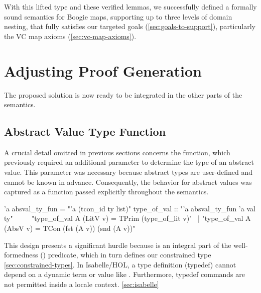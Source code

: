 With this lifted type and these verified lemmas, we successfully defined a formally sound semantics for Boogie maps, supporting up to three levels of domain nesting, that fully satisfies our targeted goals (\ref{sec:goals-to-support}), particularly the VC map axioms (\ref{sec:vc-map-axioms}).


\section{Adjusting Proof Generation}
\label{sec:proofgen-module}

The proposed solution is now ready to be integrated in the other parts of the semantics.

\subsection{Abstract Value Type Function}

A crucial detail omitted in previous sections concerns the  function, which previously required an additional parameter to determine the type of an abstract value.
This parameter was necessary because abstract types are user-defined and cannot be known in advance.
Consequently, the behavior for abstract values was captured as a function passed explicitly throughout the semantics.


\begin{isabellebody}\isanewline
{} 'a absval\_ty\_fun = "'a {\isasymRightarrow} (tcon\_id \isasymtimes ty list)"\isanewline
\isanewline
{} type\_of\_val :: "'a absval\_ty\_fun {\isasymRightarrow} 'a val {\isasymRightarrow} ty"\isanewline
\  \isanewline
\ \ \ "type\_of\_val A (LitV v) = TPrim (type\_of\_lit v)"\isanewline
\ | "type\_of\_val A (AbsV v) = TCon (fst (A v)) (snd (A v))"\isanewline
\end{isabellebody}


This design presents a significant hurdle because  is an integral part of the well-formedness () predicate,
which in turn defines our constrained type  \ref{sec:constrained-types}.
In Isabelle/HOL, a type definition (typedef) cannot depend on a dynamic term or value like .
Furthermore, typedef commands are not permitted inside a locale context. \ref{sec:isabelle}

